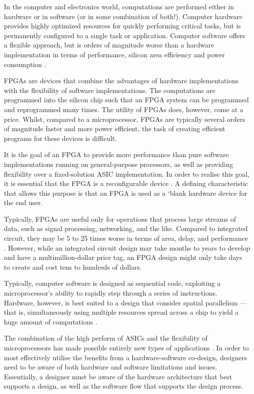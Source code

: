 In the computer and electronics world, computations are performed either in
hardware or in software (or in some combination of both!). Computer hardware
provides highly optimized resources for quickly performing critical tasks, but
is permanently configured to a single task or application. Computer software
offers a flexible approach, but is orders of magnitude worse than a hardware
implementation in terms of performance, silicon area efficiency and power
consumption \cite{Hauck:2007}.

\glspl{FPGA} are devices that combine the advantages of hardware implementations
with the flexibility of software implementations. The computations are
programmed into the silicon chip such that an \gls{FPGA} system can be
programmed and reprogrammed many times. The utility of FPGAs does, however, come
at a price. Whilst, compared to a microprocessor, \glspl{FPGA} are typically
several orders of magnitude faster and more power efficient, the task of
creating efficient programs for these devices is difficult.

It is the goal of an \gls{FPGA} to provide more performance than pure software
implementations running on general-purpose processors, as well as providing
flexibility over a fixed-solution \gls{ASIC} implementation. In order to realise
this goal, it is essential that the \gls{FPGA} is a reconfigurable device
\cite{Hauck:2007}. A defining characteristic that allows this purpose is that
an \gls{FPGA} is used as a `blank hardware device for the end user.

Typically, \glspl{FPGA} are useful only for operations that process large
streams of data, such as signal processing, networking, and the like. Compared
to integrated circuit, they may be 5 to 25 times worse in terms of area, delay,
and performance \cite{Hauck:2007}. However, while an integrated circuit design
may take months to years to develop and have a multimillion-dollar price tag, an
\gls{FPGA} design might only take days to create and cost tens to hundreds of
dollars.

Typically, computer software is designed as sequential code, exploiting a
microprocessor's ability to rapidly step through a series of instructions.
Hardware, however, is best suited to a design that consider spatial parallelism
--- that is, simultaneously using multiple resources spread across a chip to
yield a huge amount of computations \cite{Hauck:2007}.

The combination of the high perform of \glspl{ASIC} and the flexibility of
microprocessors has made possible entirely new types of applications
\cite{Hauck:2007}. In order to most effectively utilise the benefits from a
hardware-software co-design, designers need to be aware of both hardware and
software limitations and issues. Essentially, a designer must be aware of the
hardware architecture that best supports a design, as well as the software flow
that supports the design process.